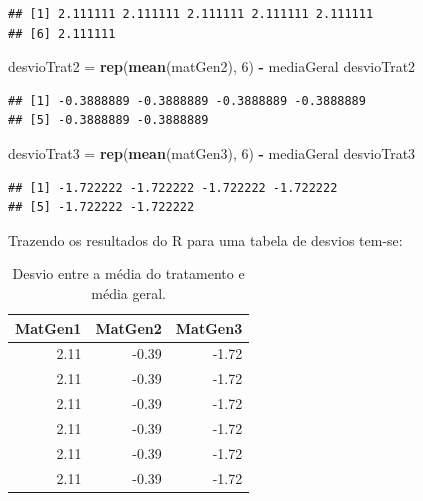 \documentclass[
]{article}
\newenvironment{Shaded}{\begin{snugshade}}{\end{snugshade}}
\newcommand{\DecValTok}[1]{\textcolor[rgb]{0.00,0.00,0.81}{#1}}
\newcommand{\KeywordTok}[1]{\textcolor[rgb]{0.13,0.29,0.53}{\textbf{#1}}}
\newcommand{\NormalTok}[1]{#1}
\newcommand{\OperatorTok}[1]{\textcolor[rgb]{0.81,0.36,0.00}{\textbf{#1}}}
\newcommand{\StringTok}[1]{\textcolor[rgb]{0.31,0.60,0.02}{#1}}
\begin{document}
\begin{verbatim}
## [1] 2.111111 2.111111 2.111111 2.111111 2.111111
## [6] 2.111111
\end{verbatim}

\begin{Shaded}
\begin{Highlighting}[]
\NormalTok{desvioTrat2 =}\StringTok{ }\KeywordTok{rep}\NormalTok{(}\KeywordTok{mean}\NormalTok{(matGen2), }\DecValTok{6}\NormalTok{) }\OperatorTok{-}\StringTok{ }\NormalTok{mediaGeral}
\NormalTok{desvioTrat2}
\end{Highlighting}
\end{Shaded}

\begin{verbatim}
## [1] -0.3888889 -0.3888889 -0.3888889 -0.3888889
## [5] -0.3888889 -0.3888889
\end{verbatim}

\begin{Shaded}
\begin{Highlighting}[]
\NormalTok{desvioTrat3 =}\StringTok{ }\KeywordTok{rep}\NormalTok{(}\KeywordTok{mean}\NormalTok{(matGen3), }\DecValTok{6}\NormalTok{) }\OperatorTok{-}\StringTok{ }\NormalTok{mediaGeral}
\NormalTok{desvioTrat3}
\end{Highlighting}
\end{Shaded}

\begin{verbatim}
## [1] -1.722222 -1.722222 -1.722222 -1.722222
## [5] -1.722222 -1.722222
\end{verbatim}

Trazendo os resultados do R para uma tabela de desvios tem-se:

\begin{table}

\caption{\label{tab:unnamed-chunk-19}Desvio entre a média do tratamento e média geral.}
\centering
\begin{tabular}[t]{r|r|r}
\hline
MatGen1 & MatGen2 & MatGen3\\
\hline
2.11 & -0.39 & -1.72\\
\hline
2.11 & -0.39 & -1.72\\
\hline
2.11 & -0.39 & -1.72\\
\hline
2.11 & -0.39 & -1.72\\
\hline
2.11 & -0.39 & -1.72\\
\hline
2.11 & -0.39 & -1.72\\
\hline
\end{tabular}
\end{table}
\end{document}

